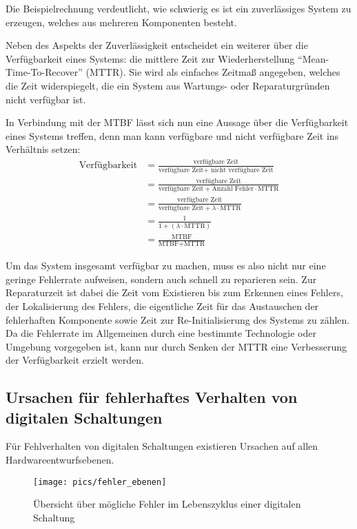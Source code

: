 Die Beispielrechnung verdeutlicht, wie schwierig es ist ein
zuverlässiges System zu erzeugen, welches aus mehreren
Komponenten besteht. 

Neben des Aspekts der Zuverlässigkeit entscheidet ein weiterer über
die Verfügbarkeit eines Systems: die mittlere Zeit zur
Wiederherstellung ``Mean-Time-To-Recover'' (MTTR). Sie wird als
einfaches Zeitmaß angegeben, welches die Zeit widerspiegelt, die ein
System aus Wartungs- oder Reparaturgründen nicht verfügbar ist. 

In Verbindung mit der MTBF lässt sich nun eine Aussage über die
Verfügbarkeit eines Systems treffen, denn man kann verfügbare und
nicht verfügbare Zeit ins Verhältnis setzen:
\begin{align}
  \label{eq:verfügbarkeit}
\nonumber  \text{Verfügbarkeit} & = \frac{\text{verfügbare
    Zeit}}{\text{verfügbare Zeit} + \text{ nicht verfügbare Zeit}}\\[3mm]
\nonumber  & = \frac{\text{verfügbare Zeit}} {\text{verfügbare Zeit} + \text{Anzahl Fehler} \cdot \text{MTTR}}\\[3mm]
\nonumber  & = \frac{\text{verfügbare Zeit}} {\text{verfügbare Zeit} + \lambda \cdot \text{MTTR}}\\[3mm]
\nonumber  & = \frac{1}{1 + (\lambda \cdot \text{MTTR})}\\[3mm]
& = \frac{\text{MTBF}}{\text{MTBF} + \text{MTTR}}
\end{align}

Um das System insgesamt verfügbar zu machen, muss es also nicht nur
eine geringe Fehlerrate aufweisen, sondern auch schnell zu reparieren
sein. Zur Reparaturzeit ist dabei die Zeit vom Existieren bis zum Erkennen eines
Fehlers, der Lokalisierung des Fehlers, die eigentliche Zeit für das
Austauschen der fehlerhaften Komponente sowie Zeit zur
Re-Initialisierung des Systems zu zählen. Da die Fehlerrate im
Allgemeinen durch eine bestimmte Technologie oder Umgebung vorgegeben
ist, kann nur durch Senken der MTTR eine Verbesserung der
Verfügbarkeit erzielt werden.


\subsection{Ursachen für fehlerhaftes Verhalten von digitalen Schaltungen}

Für Fehlverhalten von digitalen Schaltungen existieren Ursachen auf
allen Hard\-ware\-ent\-wurfs\-e\-ben\-en. 

\begin{figure}[htbp]
	\centering
		\texttt{[image: pics/fehler\_ebenen]}
	\caption{Übersicht über mögliche Fehler im Lebenszyklus einer digitalen Schaltung}
	\label{fig:grundlagen_fehlerübersicht}
\end{figure}

